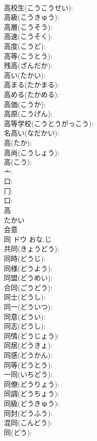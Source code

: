 \documentclass[8pt]{extreport}
\begin{document}
\begin{CJK}{UTF8}{min}
\\	高校生(こうこうせい): 
\\	高級(こうきゅう): 
\\	高層(こうそう): 
\\	高速(こうそく): 
\\	高度(こうど): 
\\	高等(こうとう): 
\\	残高(ざんだか): 
\\	高い(たかい): 
\\	高まる(たかまる): 
\\	高める(たかめる): 
\\	高価(こうか): 
\\	高原(こうげん): 
\\	高等学校(こうとうがっこう): 
\\	名高い(なだかい): 
\\	高(たか): 
\\	高尚(こうしょう): 
\\	高(こう): 
\\	亠: 
\\	口: 
\\	冂: 
\\	口: 
\\	高	
\\	たかい	
\\	会意 
\\	同	ドウ	おな.じ		
\\	共同(きょうどう): 
\\	同時(どうじ): 
\\	同様(どうよう): 
\\	同盟(どうめい): 
\\	合同(ごうどう): 
\\	同士(どうし): 
\\	同一(どういつ): 
\\	同意(どうい): 
\\	同志(どうし): 
\\	同情(どうじょう): 
\\	同居(どうきょ): 
\\	同感(どうかん): 
\\	同等(どうとう): 
\\	一同(いちどう): 
\\	同僚(どうりょう): 
\\	同調(どうちょう): 
\\	同級(どうきゅう): 
\\	同封(どうふう): 
\\	混同(こんどう): 
\\	同(どう): 

\end{CJK}
\end{document}
